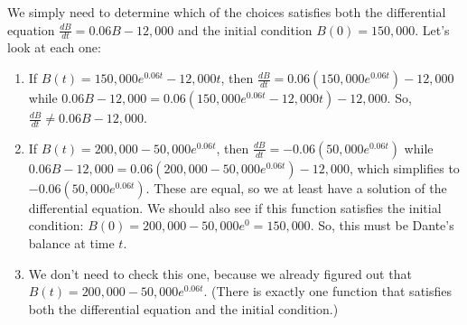 \documentclass[main]{subfiles}
\begin{document}
\begin{enumerate}[resume]
\begin{enumerate}
    \begin{solution}
      We simply need to determine which of the choices satisfies both the
      differential equation $\frac{dB}{dt} = 0.06 B - 12,000$ and the
      initial condition $B(0) = 150,000$.  Let's look at each one:
      \begin{enumerate}[label=\roman*.]
      \item If $B(t) = 150,000 e^{0.06 t} - 12,000 t$, then $\frac{dB}{dt}
        = 0.06 (150,000 e^{0.06 t}) - 12,000$ while $0.06 B - 12,000 =
        0.06 (150,000 e^{0.06 t} - 12,000 t) - 12,000$.  So,
        $\frac{dB}{dt} \neq 0.06 B - 12,000$.
      \item If $B(t) = 200,000 - 50,000 e^{0.06 t}$, then $\frac{dB}{dt} =
        - 0.06 (50,000 e^{0.06 t})$ while $0.06 B - 12,000 = 0.06 \left(
          200,000 - 50,000 e^{0.06 t} \right) - 12,000$, which simplifies
        to $- 0.06 (50,000 e^{0.06 t})$.  These are equal, so we at least
        have a solution of the differential equation.  We should also see
        if this function satisfies the initial condition: $B(0) = 200,000
        - 50,000 e^{0} = 150,000$.  So, this must be Dante's balance at
        time $t$.
      \item We don't need to check this one, because we already figured
        out that $B(t) = 200,000 - 50,000 e^{0.06 t}$.  (There is exactly
        one function that satisfies both the differential equation and the
        initial condition.)
      \end{enumerate}
    \end{solution}

  \end{enumerate}

\end{enumerate}
\end{document}
